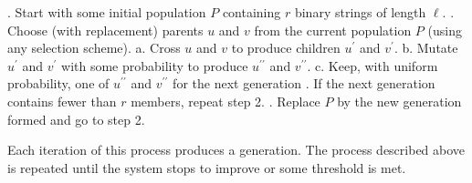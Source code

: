 \begin{algorithm}
\label{realGA}
\caption*{}
\begin{algorithmic}[1]
. Start with some initial population $P$ containing $r$ binary strings of length $\ell$.
. Choose (with replacement) parents $u$ and $v$ from the current population $P$ (using any selection scheme).
  \Statex \hspace{\algorithmicindent} a. Cross $u$ and $v$ to produce children $u^\prime$ and $v^\prime$.
  \Statex \hspace{\algorithmicindent} b. Mutate $u^\prime$ and $v^\prime$ with some probability to produce $u^{\prime\prime}$ and $v^{\prime\prime}$.
  \Statex \hspace{\algorithmicindent} c. Keep, with uniform probability, one of $u^{\prime\prime}$ and $v^{\prime\prime}$ for the next generation 
. If the next generation contains fewer than $r$ members, repeat step 2.
. Replace $P$ by the new generation formed and go to step 2.
\end{algorithmic}
\end{algorithm}

Each iteration of this process produces a generation. 
The process described above is repeated until the system stops to improve or some threshold is met.

